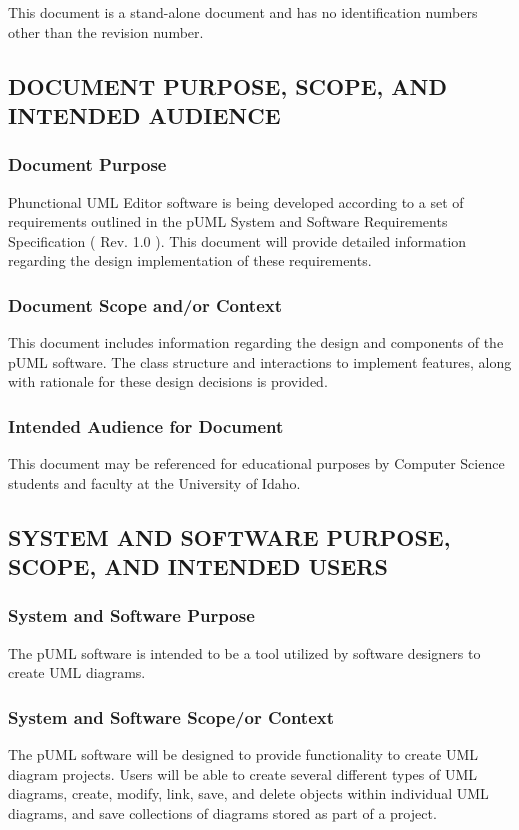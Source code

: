 \documentclass[twoside,letterpaper]{article}
\begin{document}
{
This document is a stand-alone document and has no identification numbers other than the revision number.

\subsection[DOCUMENT PURPOSE, SCOPE, AND INTENDED AUDIENCE]
{\bfseries DOCUMENT PURPOSE, SCOPE, AND INTENDED AUDIENCE}

\subsubsection{Document Purpose}
{
Phunctional UML Editor software is being developed according to a set of requirements outlined in the pUML System and Software Requirements Specification ( Rev. 1.0 ). This document will provide detailed information regarding the design implementation of these requirements.
}

\subsubsection{Document Scope and/or Context}
{
This document includes information regarding the design and components of the pUML software. The class structure and interactions to implement features, along with rationale for these design decisions is provided.
}

\subsubsection{Intended Audience for Document}
{
This document may be referenced for educational purposes by
Computer Science students and faculty at the University of Idaho.
}

\subsection[SYSTEM AND SOFTWARE PURPOSE, SCOPE, AND INTENDED
USERS]{\bfseries SYSTEM AND
SOFTWARE PURPOSE, SCOPE, AND INTENDED USERS}


\subsubsection{System and Software Purpose}
{
The pUML software is intended to be a tool utilized by software designers to create UML diagrams. 
}

\subsubsection[System and Software Scope/or Context]{System and Software
Scope/or Context}
{
The pUML software will be designed to provide functionality to create UML diagram projects.  Users will be able to create several different types of UML diagrams, create, modify, link, save, and delete objects within individual UML diagrams, and save collections of diagrams stored as part of a project.
}

}
\end{document}
